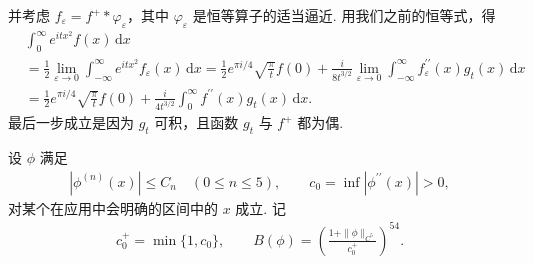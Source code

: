 并考虑 $f_{\varepsilon} = f^{+} * \varphi_{\varepsilon}$，其中 $\varphi_{\varepsilon}$ 是恒等算子的适当逼近. 用我们之前的恒等式，得
\begin{align*}
  &\int_{0}^{\infty}e^{itx^{2}}f(x)\,\mathrm{d}x\\
  &=\frac{1}{2}\lim_{\varepsilon\rightarrow 0}\int_{-\infty}^{\infty}e^{itx^{2}}f_{\varepsilon}(x)\,\mathrm{d}x
  =\frac{1}{2}e^{\pi i/4}\sqrt{\frac{\pi}{t}}f(0)
   +\frac{i}{8t^{3/2}}\lim_{\varepsilon\rightarrow 0}\int_{-\infty}^{\infty}f_{\varepsilon}^{\prime\prime}(x)g_{t}(x)\,\mathrm{d}x\\
  &=\frac{1}{2}e^{\pi i/4}\sqrt{\frac{\pi}{t}}f(0)
   +\frac{i}{4t^{3/2}}\int_{0}^{\infty}f^{\prime\prime}(x)g_{t}(x)\,\mathrm{d}x.
\end{align*}
最后一步成立是因为 $g_{t}$ 可积，且函数 $g_{t}$ 与 $f^{+}$ 都为偶.

\begin{definition}\label{def:9.2}
设 $\phi$ 满足
\begin{align*}
  |\phi^{(n)}(x)|\leq C_{n}\quad (0\leq n\leq 5),\qquad
  c_{0}=\inf|\phi^{\prime\prime}(x)|>0,
\end{align*}
对某个在应用中会明确的区间中的 $x$ 成立. 记
\begin{align*}
  c_{0}^{+}=\min\{1,c_{0}\},\qquad
  B(\phi)=\left(\frac{1+\|\phi\|_{C^{5}}}{c_{0}^{+}}\right)^{54}.
\end{align*}
\end{definition}

